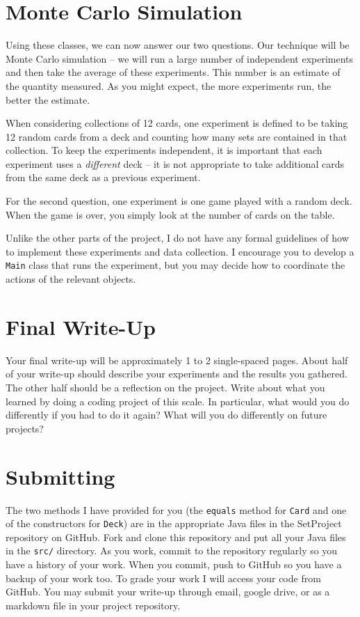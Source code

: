 \documentclass[11pt]{article}
\begin{document}
\section*{Monte Carlo Simulation}

Using these classes, we can now answer our two questions.  Our technique will
be Monte Carlo simulation -- we will run a large number of independent
experiments and then take the average of these experiments.  This number is an
estimate of the quantity measured.  As you might expect, the more experiments
run, the better the estimate.

When considering collections of 12 cards, one experiment is defined to be
taking 12 random cards from a deck and counting how many sets are contained in
that collection.  To keep the experiments independent, it is important that
each experiment uses a {\em different} deck -- it is not appropriate to take
additional cards from the same deck as a previous experiment.

For the second question, one experiment is one game played with a random deck.
When the game is over, you simply look at the number of cards on the table.

Unlike the other parts of the project, I do not have any formal guidelines of
how to implement these experiments and data collection.  I encourage you to
develop a {\tt Main} class that runs the experiment, but you may decide how to
coordinate the actions of the relevant objects.

\section*{Final Write-Up}

Your final write-up will be approximately 1 to 2 single-spaced pages.  About
half of your write-up should describe your experiments and the results you
gathered.  The other half should be a reflection on the project. Write about
what you learned by doing a coding project of this scale.  In particular, what
would you do differently if you had to do it again? What will you do
differently on future projects?

\section*{Submitting}

The two methods I have provided for you (the {\tt equals} method for {\tt Card}
and one of the constructors for {\tt Deck}) are in the appropriate Java files
in the SetProject repository on GitHub. Fork and clone this repository and put
all your Java files in the {\tt src/} directory. As you work, commit to the
repository regularly so you have a history of your work. When you commit, push
to GitHub so you have a backup of your work too. To grade your work I will
access your code from GitHub. You may submit your write-up through email,
google drive, or as a markdown file in your project repository.
\end{document}
